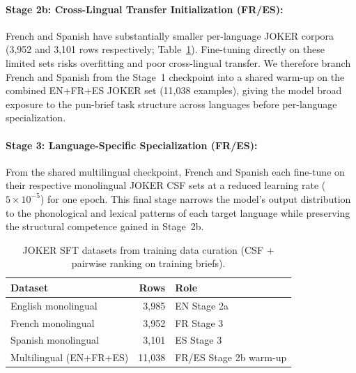 \documentclass[]{ceurart}
\begin{document}
\paragraph{Stage 2b: Cross-Lingual Transfer Initialization (FR/ES):}
French and Spanish have substantially smaller per-language JOKER corpora
(3,952 and 3,101 rows respectively; Table~\ref{tab:sft-data}).
Fine-tuning directly on these limited sets risks overfitting and poor
cross-lingual transfer.
We therefore branch French and Spanish from the Stage~1 checkpoint into a
shared warm-up on the combined EN+FR+ES JOKER set (11,038 examples),
giving the model broad exposure to the pun-brief task structure across
languages before per-language specialization.

\paragraph{Stage 3: Language-Specific Specialization (FR/ES):}
From the shared multilingual checkpoint, French and Spanish each fine-tune
on their respective monolingual JOKER CSF sets at a reduced learning rate
($5{\times}10^{-5}$) for one epoch.
This final stage narrows the model's output distribution to the phonological
and lexical patterns of each target language while preserving the structural
competence gained in Stage~2b.

\begin{table}[t]
  \caption{JOKER SFT datasets from training data curation (CSF + pairwise ranking on training briefs).}
  \label{tab:sft-data}
  \small
  \begin{tabular}{lrl}
    \toprule
    Dataset & Rows & Role \\
    \midrule
    English monolingual      & 3,985  & EN Stage 2a \\
    French monolingual       & 3,952  & FR Stage 3 \\
    Spanish monolingual      & 3,101  & ES Stage 3 \\
    Multilingual (EN+FR+ES)  & 11,038 & FR/ES Stage 2b warm-up \\
    \bottomrule
  \end{tabular}
\end{table}
\end{document}
